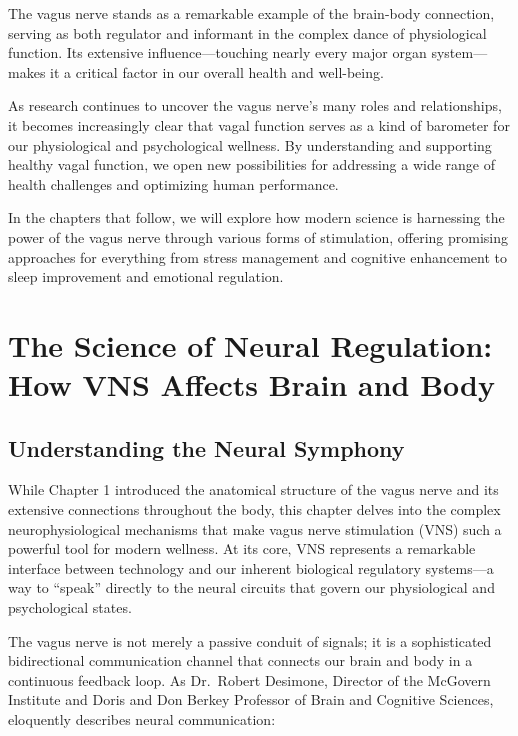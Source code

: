 \documentclass[
  Letterpaper,
]{scrbook}
\begin{document}
The vagus nerve stands as a remarkable example of the brain-body
connection, serving as both regulator and informant in the complex dance
of physiological function. Its extensive influence---touching nearly
every major organ system---makes it a critical factor in our overall
health and well-being.

As research continues to uncover the vagus nerve's many roles and
relationships, it becomes increasingly clear that vagal function serves
as a kind of barometer for our physiological and psychological wellness.
By understanding and supporting healthy vagal function, we open new
possibilities for addressing a wide range of health challenges and
optimizing human performance.

In the chapters that follow, we will explore how modern science is
harnessing the power of the vagus nerve through various forms of
stimulation, offering promising approaches for everything from stress
management and cognitive enhancement to sleep improvement and emotional
regulation.


\chapter{The Science of Neural Regulation: How VNS Affects Brain and
Body}\label{the-science-of-neural-regulation-how-vns-affects-brain-and-body}

\section{Understanding the Neural
Symphony}\label{understanding-the-neural-symphony}

While Chapter 1 introduced the anatomical structure of the vagus nerve
and its extensive connections throughout the body, this chapter delves
into the complex neurophysiological mechanisms that make vagus nerve
stimulation (VNS) such a powerful tool for modern wellness. At its core,
VNS represents a remarkable interface between technology and our
inherent biological regulatory systems---a way to ``speak'' directly to
the neural circuits that govern our physiological and psychological
states.

The vagus nerve is not merely a passive conduit of signals; it is a
sophisticated bidirectional communication channel that connects our
brain and body in a continuous feedback loop. As Dr.~Robert Desimone,
Director of the McGovern Institute and Doris and Don Berkey Professor of
Brain and Cognitive Sciences, eloquently describes neural communication:
\end{document}
